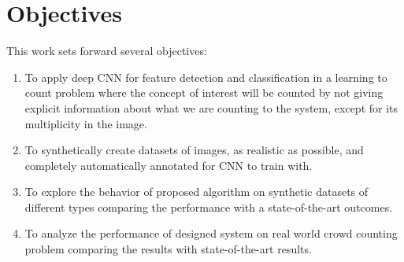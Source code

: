\section{Objectives}
This work sets forward several objectives:
\begin{enumerate}
	\item To apply deep CNN for feature detection and classification in a learning to count problem where the concept of interest will be counted by not giving explicit information about what we are counting to the system, except for its multiplicity in the image. 
	\item To synthetically create datasets of images, as realistic as possible, and completely automatically annotated for CNN to train with.
	\item To explore the behavior of proposed algorithm on synthetic datasets of different types comparing the performance with a state-of-the-art outcomes\cite{segui2015learning}.   
	\item To analyze the performance of designed system on real world crowd counting problem comparing the results with state-of-the-art results\cite{chan2008privacy}.   

\end{enumerate}
